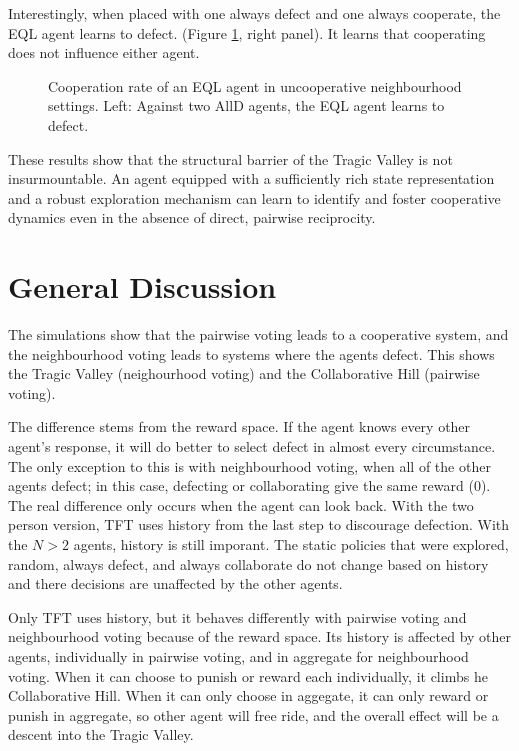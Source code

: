 \documentclass[]{llncs} %
\begin{document}
Interestingly, when placed with one always defect and one always
cooperate, the EQL agent learns to defect. (Figure
\ref{fig:EQL_vs_AllD_AllC_neighbourhood}, right panel). It learns that
cooperating does not influence either agent.

\begin{figure}[ht]
    \centering
    \caption{Cooperation rate of an EQL agent in uncooperative neighbourhood settings. Left: Against two AllD agents, the EQL agent learns to defect.}
    \label{fig:EQL_vs_AllD_AllC_neighbourhood}
\end{figure}

These results show that the structural barrier of the Tragic Valley is
not insurmountable. An agent equipped with a sufficiently rich state
representation and a robust exploration mechanism can learn to
identify and foster cooperative dynamics even in the absence of
direct, pairwise reciprocity.

\section{General Discussion}
\label{sec:general_discussion}
The simulations show that the pairwise voting leads to a cooperative
system, and the neighbourhood voting leads to systems where the agents
defect.  This shows the Tragic Valley (neighourhood voting) and the
Collaborative Hill (pairwise voting).

The difference stems from the reward space.  If the agent knows every
other agent's response, it will do better to select defect in almost
every circumstance.  The only exception to this is with neighbourhood
voting, when all of the other agents defect;  in this case, defecting
or collaborating give the same reward (0). The real difference only occurs
when the agent can look back.  With the two person version, TFT
uses history from the last step to discourage defection.  With the $N > 2$
agents, history is still imporant.  The static policies that were explored,
random, always defect, and always collaborate do not change based on history
and there decisions are unaffected by the other agents.

Only TFT uses history, but it behaves differently with pairwise voting and
neighbourhood voting because of the reward space.  Its history is affected
by other agents, individually in pairwise voting, and in aggregate for
neighbourhood voting.  When it can choose to punish or reward each individually,
it climbs he Collaborative Hill.  When it can only choose in aggegate, it
can only reward or punish in aggregate, so other agent will free ride, and
the overall effect will be a descent into the Tragic Valley.
\end{document}
